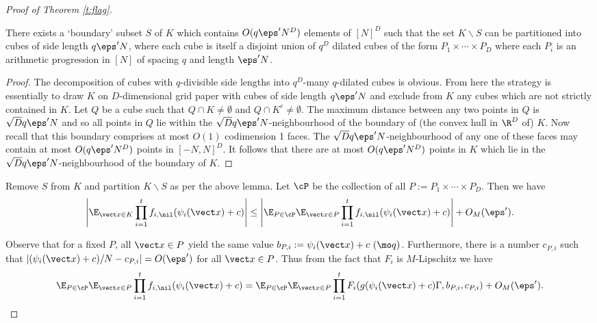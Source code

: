\begin{proof}[Proof of Theorem \ref{t:flag}]
\begin{lemma}\label{l:packing}
There exists a `boundary' subset $S$ of $K$ which contains $O(q\eps'N^D)$ elements of $[N]^D$ such that the set $K\backslash S$ can be partitioned into cubes of side length $q\eps'N$, where each cube is itself a disjoint union of $q^D$ dilated cubes of the form $P_1 \times \cdots \times P_D$ where each $P_i$ is an arithmetic progression in $[N]$ of spacing $q$ and length $\eps'N$.
\end{lemma} 
\begin{proof}
The decomposition of cubes with $q$-divisible side lengths into $q^D$-many $q$-dilated cubes is obvious. From here the strategy is essentially to draw $K$ on $D$-dimensional grid paper with cubes of side length $q \eps'N$ and exclude from $K$ any cubes which are not strictly contained in $K$. 
Let $Q$ be  a cube such that $Q \cap K \ne \emptyset$ and $Q \cap K^c \ne \emptyset$. 
The maximum distance between any two points in $Q$ is $\sqrt{D}q\eps'N$ and so all points in $Q$ lie within the $\sqrt{D}q\eps'N$-neighbourhood of the boundary of (the convex hull in $\R^D$ of) $K$. Now recall that this boundary comprises at most $O(1)$ codimension 1 faces. The $\sqrt{D}q\eps'N$-neighbourhood of any one of these faces may contain at most $O(q\eps'N^D)$ points in $[-N,N]^D$. It follows that there are at most $O(q\eps'N^D)$ points in $K$ which lie in the $\sqrt{D}q\eps'N$-neighbourhood of the boundary of $K$.
\end{proof}

Remove $S$ from $K$ and partition $K\backslash S$ as per the above lemma. Let $\cP$ be the collection of all $P:= P_1 \times \cdots \times P_D$. Then we have 
\begin{equation}
\left|\E_{\vect x \in K} \prod_{i=1}^t  f_{i,\nil}(\psi_i(\vect x) + c)\right| \leq \left|\E_{P\in \cP}\E_{\vect x \in P} \prod_{i=1}^t f_{i,\nil}(\psi_i(\vect x) + c)\right| + O_M(\eps').
\end{equation}

Observe that for a fixed $P$, all $\vect x \in P$ yield the same value $b_{P,i}:= \psi_i(\vect x) + c \ (\mo q)$. Furthermore, there is a number $c_{P,i}$ such that $|(\psi_i(\vect x) + c)/N-c_{P,i}| = O(\eps')$ for all $\vect x \in P$. Thus from the fact that $F_i$ is $M$-Lipschitz we have   
\begin{equation}
\E_{P\in \cP}\E_{\vect x \in P} \prod_{i=1}^t f_{i,\nil}( \psi_i(\vect x) + c) = \E_{P\in \cP}\E_{\vect x \in P} \prod_{i=1}^t F_i(g( \psi_i(\vect x) + c)\Gamma,b_{P,i},c_{P,i}) + O_M(\eps').
\end{equation}


\end{proof}
